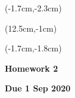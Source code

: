 \documentclass[12pt, oneside]{article}
\begin{document}
\begin{textblock*}{4cm}(-1.7cm,-2.3cm)
\end{textblock*}

\begin{textblock*}{8cm}(12.5cm,-1cm)
\end{textblock*}
\begin{textblock*}{13.5cm}(-1.7cm,-1.8cm)
\end{textblock*}

\vspace{1cm}

\begin{center}
\textbf{\Large Homework 2}

\textbf{Due 1 Sep 2020}
\end{center}
\end{document}
